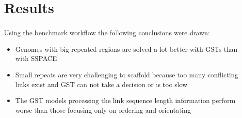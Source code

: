 \documentclass{beamer}
\begin{document}
\begin{frame}
\begin{center}
{
}
\end{center}
\end{frame}

\section{Results}\label{15}
\begin{frame}
\frametitle{\textsc{}}
Using the benchmark workflow the following conclusions were drawn: 
\begin{itemize}
\item Genomes with big repeated regions are solved a lot better with GSTs than with SSPACE
\item Small repeats are very challenging to scaffold because too many conflicting links exist and GST can not take a decision or is too slow
\item The GST models processing the link sequence length information perform worse than those focusing only on ordering and orientating
\end{itemize}
\end{frame}
\end{document}
